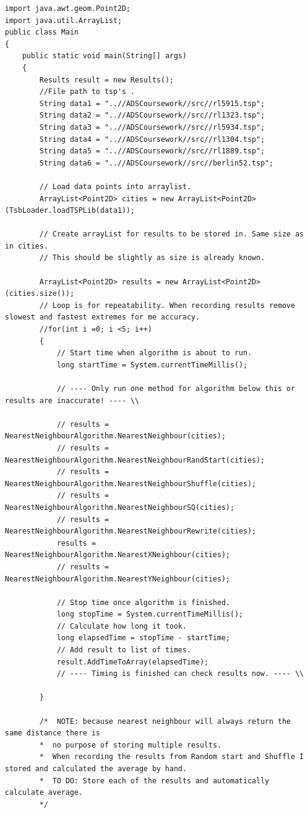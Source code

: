 \documentclass[conference,backref=page]{acmsiggraph}
\begin{document}
\onecolumn
\begin{verbatim}
import java.awt.geom.Point2D;
import java.util.ArrayList;
public class Main
{
	public static void main(String[] args)
	{
		Results result = new Results();		
		//File path to tsp's . 
		String data1 = "..//ADSCoursework//src//rl5915.tsp";
		String data2 = "..//ADSCoursework//src//rl1323.tsp";
		String data3 = "..//ADSCoursework//src//rl5934.tsp";
		String data4 = "..//ADSCoursework//src//rl1304.tsp";
		String data5 = "..//ADSCoursework//src//rl1889.tsp";
		String data6 = "..//ADSCoursework//src//berlin52.tsp";
		
		// Load data points into arraylist.
		ArrayList<Point2D> cities = new ArrayList<Point2D>(TsbLoader.loadTSPLib(data1));
		
		// Create arrayList for results to be stored in. Same size as in cities.
		// This should be slightly as size is already known.
		
		ArrayList<Point2D> results = new ArrayList<Point2D>(cities.size());
		// Loop is for repeatability. When recording results remove slowest and fastest extremes for me accuracy.
		//for(int i =0; i <5; i++)
		{
			// Start time when algorithm is about to run.
			long startTime = System.currentTimeMillis();
			
			// ---- Only run one method for algorithm below this or results are inaccurate! ---- \\
			
			// results = NearestNeighbourAlgorithm.NearestNeighbour(cities);
			// results = NearestNeighbourAlgorithm.NearestNeighbourRandStart(cities);
			// results = NearestNeighbourAlgorithm.NearestNeighbourShuffle(cities);
			// results = NearestNeighbourAlgorithm.NearestNeighbourSQ(cities);
			// results = NearestNeighbourAlgorithm.NearestNeighbourRewrite(cities);
			results = NearestNeighbourAlgorithm.NearestXNeighbour(cities);
			// results = NearestNeighbourAlgorithm.NearestYNeighbour(cities);
			
			// Stop time once algorithm is finished.
			long stopTime = System.currentTimeMillis();
			// Calculate how long it took.
			long elapsedTime = stopTime - startTime;
			// Add result to list of times.
			result.AddTimeToArray(elapsedTime);
			// ---- Timing is finished can check results now. ---- \\
			
		}
		
		/*	NOTE: because nearest neighbour will always return the same distance there is
		*  no purpose of storing multiple results. 
		*  When recording the results from Random start and Shuffle I stored and calculated the average by hand.
		*  TO DO: Store each of the results and automatically calculate average.
		*/
		

\end{verbatim}
\end{document}
